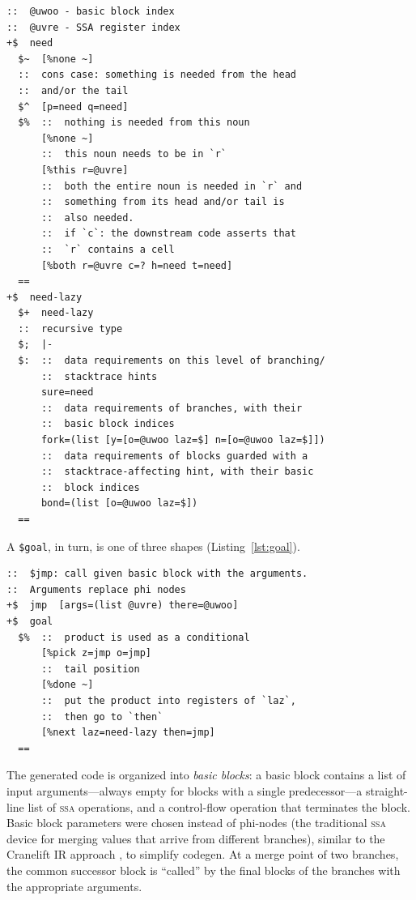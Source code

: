 \documentclass[twoside]{article}
\begin{document}
\begin{lstlisting}[style=listingblock,
                   label=lst:need-lazy,
                   float=hbtp,
                   caption={The \texttt{\$need-lazy} type providing the data requirement for Nock formula code generation.}]
::  @uwoo - basic block index
::  @uvre - SSA register index
+$  need
  $~  [%none ~]
  ::  cons case: something is needed from the head
  ::  and/or the tail
  $^  [p=need q=need]
  $%  ::  nothing is needed from this noun
      [%none ~]
      ::  this noun needs to be in `r`
      [%this r=@uvre]
      ::  both the entire noun is needed in `r` and
      ::  something from its head and/or tail is
      ::  also needed.
      ::  if `c`: the downstream code asserts that
      ::  `r` contains a cell
      [%both r=@uvre c=? h=need t=need]
  ==
+$  need-lazy
  $+  need-lazy
  ::  recursive type
  $;  |-
  $:  ::  data requirements on this level of branching/
      ::  stacktrace hints
      sure=need
      ::  data requirements of branches, with their
      ::  basic block indices
      fork=(list [y=[o=@uwoo laz=$] n=[o=@uwoo laz=$]])
      ::  data requirements of blocks guarded with a
      ::  stacktrace-affecting hint, with their basic
      ::  block indices
      bond=(list [o=@uwoo laz=$])
  ==
\end{lstlisting}

A \texttt{\$goal}, in turn, is one of three shapes (Listing~\ref{lst:goal}).

\begin{lstlisting}[style=listingblock,
                   label=lst:goal,
                   float=hbtp,
                   caption={The \texttt{\$goal} type providing the objective for Nock formula code generation.}]
::  $jmp: call given basic block with the arguments.
::  Arguments replace phi nodes
+$  jmp  [args=(list @uvre) there=@uwoo]
+$  goal
  $%  ::  product is used as a conditional
      [%pick z=jmp o=jmp]
      ::  tail position
      [%done ~]
      ::  put the product into registers of `laz`,
      ::  then go to `then`
      [%next laz=need-lazy then=jmp]
  ==
\end{lstlisting}

The generated code is organized into \emph{basic blocks}: a basic block contains a list of input arguments---always empty for blocks with a single predecessor---a straight-line list of \textsc{ssa} operations, and a control-flow operation that terminates the block. Basic block parameters were chosen instead of phi-nodes (the traditional \textsc{ssa} device for merging values that arrive from different branches), similar to the Cranelift IR approach \citep{cranelift-ir}, to simplify codegen. At a merge point of two branches, the common successor block is ``called'' by the final blocks of the branches with the appropriate arguments.
\end{document}
